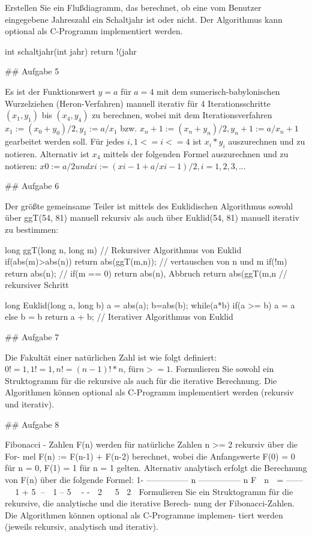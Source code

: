 Erstellen Sie ein Flußdiagramm, das berechnet, ob eine vom Benutzer eingegebene Jahreszahl ein Schaltjahr ist oder nicht. Der Algorithmus kann optional als C-Programm implementiert werden.

    int schaltjahr(int jahr){
      return !(jahr%
    }

## Aufgabe 5

Es ist der Funktionswert $ y = a $ für $ a = 4 $ mit dem sumerisch-babylonischen Wurzelziehen (Heron-Verfahren) manuell iterativ für 4 Iterationsschritte $ (x_1, y_1) $ bis $ (x_4, y_4) $ zu berechnen, wobei mit dem Iterationsverfahren $ x_1 := (x_0 + y_0) / 2 , y_1 := a / x_1 $ bzw. $ x_n+1 := (x_n + y_n) / 2 , y_n+1 := a / x_n+1 $ gearbeitet werden soll. Für jedes $ i, 1 <= i <= 4 $ ist $ x_i * y_i $ auszurechnen und zu notieren.
Alternativ ist $ x_4 $ mittels der folgenden Formel auszurechnen und zu notieren:
$ x0 := a / 2 und xi := ( xi-1 + a / xi-1 ) / 2 , i = 1, 2, 3, ... $

## Aufgabe 6

Der größte gemeinsame Teiler ist mittels des Euklidischen Algorithmus sowohl über ggT(54, 81) manuell rekursiv als auch über Euklid(54, 81) manuell iterativ zu bestimmen:

    long ggT(long n, long m){
      // Rekursiver Algorithmus von Euklid
      if(abs(m)>abs(n)) return abs(ggT(m,n)); // vertauschen von n und m
      if(!m) return abs(n);
      // if(m == 0) return abs(n), Abbruch
      return abs(ggT(m,n%
      // rekursiver Schritt
    }

    long Euklid(long a, long b){
      a = abs(a); b=abs(b);
      while(a*b){
        if(a >= b) a = a %
        else b = b %
      }
      return a + b;
    }
    // Iterativer Algorithmus von Euklid

## Aufgabe 7

Die Fakultät einer natürlichen Zahl ist wie folgt definiert: $ 0! = 1 , 1! = 1, n! = (n-1)! * n \text{, für} n >= 1$. Formulieren Sie sowohl ein Struktogramm für die rekursive als auch für die iterative Berechnung. Die Algorithmen können optional als C-Programm implementiert werden (rekursiv und iterativ).

## Aufgabe 8

Fibonacci - Zahlen F(n) werden für natürliche Zahlen n >= 2 rekursiv über die For-
mel F(n) := F(n-1) + F(n-2) berechnet, wobei die Anfangswerte F(0) = 0 für n = 0, F(1) = 1 für
n = 1 gelten. Alternativ analytisch erfolgt die Berechnung von F(n) über die folgende Formel:
1- --------------- n --------------- n
F  n  = ------   1 + 5 –  1 – 5 
-
-
 2  
5 2 
Formulieren Sie ein Struktogramm für die rekursive, die analytische und die iterative Berech-
nung der Fibonacci-Zahlen. Die Algorithmen können optional als C-Programme implemen-
tiert werden (jeweils rekursiv, analytisch und iterativ).

